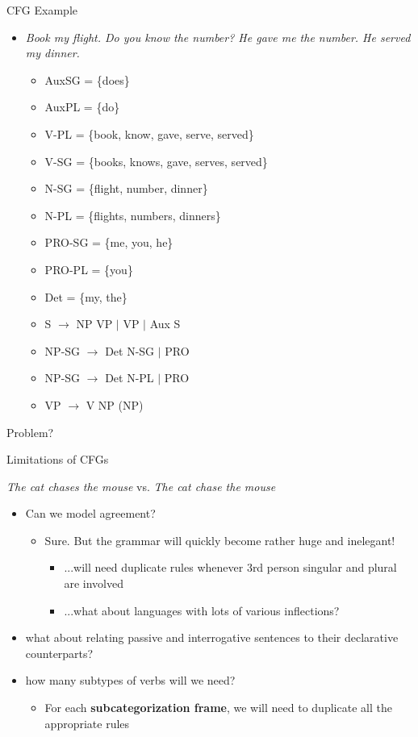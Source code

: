 \documentclass{beamer}
\begin{document}
\begin{frame}{CFG Example}
  \begin{itemize}
  \item {\it Book my flight. Do you know the number? He gave me the number. He served my dinner.}
    \begin{itemize}
    \item AuxSG = \{does\}
    \item AuxPL = \{do\}
    \item V-PL = \{book, know, gave, serve, served\}
    \item V-SG = \{books, knows, gave, serves, served\}
    \item N-SG = \{flight, number, dinner\} 
    \item N-PL = \{flights, numbers, dinners\} 
    \item PRO-SG = \{me, you, he\}
    \item PRO-PL = \{you\}
    \item Det = \{my, the\}
    \item S $\rightarrow$ NP VP $\vert$ VP $\vert$ Aux S
    \item NP-SG $\rightarrow$ Det N-SG $\vert$ PRO
    \item NP-SG $\rightarrow$ Det N-PL $\vert$ PRO
    \item VP $\rightarrow$ V NP (NP)
    \end{itemize}
  \end{itemize}
  
  Problem?
\end{frame}


\begin{frame}{Limitations of CFGs}

  {\it The cat chases the mouse} vs. {\it *The cat chase the mouse}
  
  \begin{itemize}
  \item Can we model agreement?
    \begin{itemize}
    \item Sure. But the grammar will quickly become rather huge and inelegant!
      \begin{itemize}
      \item ...will need duplicate rules whenever 3rd person singular and plural are involved
      \item ...what about languages with lots of various inflections?
      \end{itemize}
    \end{itemize}
  \item what about relating passive and interrogative sentences to
    their declarative counterparts?
  \item how many subtypes of verbs will we need?
    \begin{itemize}
    \item For each {\bf subcategorization frame}, we will need to
      duplicate all the appropriate rules
    \end{itemize}
  \end{itemize}
\end{frame}
\end{document}
